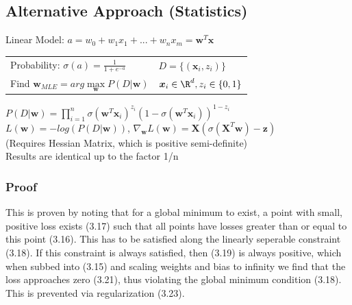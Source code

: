 \documentclass[english]{latex4ei/latex4ei_sheet}
\begin{document}
\begin{sectionbox}
\subsection{Alternative Approach (Statistics)}
Linear Model: $a = w_0+w_1x_1+...+w_nx_m = \boldsymbol{w}^T\boldsymbol{x}$\\
\begin{tabular}{ll}
    Probability: $\sigma(a)=\frac{1}{1+e^{-a}}$ & $D=\{(\boldsymbol{x}_i,z_i)\}$\\
    Find $\boldsymbol{w}_{MLE}=arg \max\limits_{\boldsymbol{w}} P(D|\boldsymbol{w})$ &  $\boldsymbol{x}_i\in \R^d, z_i\in\{0,1\}$\\
\end{tabular}
$P(D|\boldsymbol{w})=\prod\limits_{i=1}^n\sigma(\boldsymbol{w}^T\boldsymbol{x}_i)^{z_i}(1-\sigma(\boldsymbol{w}^T\boldsymbol{x}_i))^{1-z_i}$\\
$L(\boldsymbol{w})=-log(P(D|\boldsymbol{w}))$, $\nabla_{\boldsymbol{w}}L(\boldsymbol{w})=\boldsymbol{X}(\sigma(\boldsymbol{X}^T\boldsymbol{w})-\boldsymbol{z})$\\
(Requires Hessian Matrix, which is positive semi-definite)\\
Results are identical up to the factor 1/n
\\
\subsubsection{Proof}
This is proven by noting that for a global minimum to exist, a point with small, positive loss exists (3.17) such that all points have losses greater than or equal to this point (3.16). This has to be satisfied along the linearly seperable constraint (3.18). If this constraint is always satisfied, then (3.19) is always positive, which when subbed into (3.15) and scaling weights and bias to infinity we find that the loss approaches zero (3.21), thus violating the global minimum condition (3.18). This is prevented via regularization (3.23).
\end{sectionbox}
\end{document}
